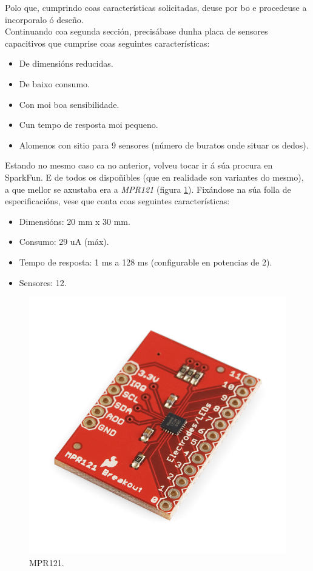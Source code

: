   Polo que, cumprindo coas características solicitadas, deuse por bo e
  procedeuse a incorporalo ó deseño. \\

  Continuando coa segunda sección, precisábase dunha placa de sensores
  capacitivos que cumprise coas seguintes características:

  \begin{itemize}
   \item De dimensións reducidas.
   \item De baixo consumo.
   \item Con moi boa sensibilidade.
   \item Cun tempo de resposta moi pequeno.
   \item Alomenos con sitio para 9 sensores (número de buratos onde situar os
         dedos).
  \end{itemize}

  Estando no mesmo caso ca no anterior, volveu tocar ir á súa procura en
  SparkFun. E de todos os dispoñibles (que en realidade son variantes do
  mesmo), a que mellor se axustaba era a \textit{MPR121} \cite{MPR121}
  (figura \ref{figura:MPR121}). Fixándose na súa folla de especificacións, vese
  que conta coas seguintes características:

  \begin{itemize}
   \item Dimensións: 20 mm x 30 mm.
   \item Consumo: 29 uA (máx).
   \item Tempo de resposta: 1 ms a 128 ms (configurable en potencias de 2).
   \item Sensores: 12.
  \end{itemize}

  \begin{figure}[htbp]
   \centering
   \includegraphics[keepaspectratio=true]{./imagenes/mpr121.jpg}
   \caption{MPR121.}
   \label{figura:MPR121}
  \end{figure}

